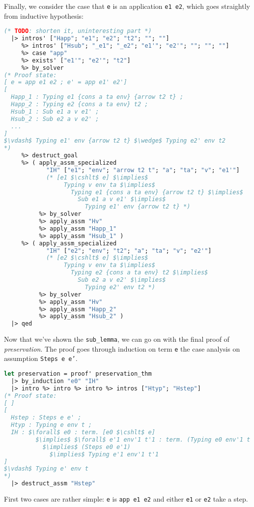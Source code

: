 \documentclass[english, mgr]{iithesis}
\renewcommand{\tt}[1]{\texttt{\small{#1}}}
\renewcommand{\it}[1]{\textit{#1}}
\begin{document}
Finally, we consider the case that \tt{e} is an application \tt{e1 e2},
which goes straightly from inductive hypothesis:
\begin{lstlisting}[mathescape, language=OCaml]
  (* TODO: shorten it, uninteresting part *)
  |> intros' ["Happ"; "e1"; "e2"; "t2"; ""; ""]
     %> intros' ["Hsub"; "_e1"; "_e2"; "e1'"; "e2'"; ""; ""; ""]
     %> case "app"
     %> exists' ["e1'"; "e2'"; "t2"]
     %> by_solver
(* Proof state:
[ e = app e1 e2 ; e' = app e1' e2']
[
  Happ_1 : Typing e1 {cons a ta env} {arrow t2 t} ;
  Happ_2 : Typing e2 {cons a ta env} t2 ;
  Hsub_1 : Sub e1 a v e1' ;
  Hsub_2 : Sub e2 a v e2' ;
  ...
]
$\vdash$ Typing e1' env {arrow t2 t} $\wedge$ Typing e2' env t2
*)
     %> destruct_goal
     %> ( apply_assm_specialized
            "IH" ["e1"; "env"; "arrow t2 t"; "a"; "ta"; "v"; "e1'"]
            (* [e1 $\cshlt$ e] $\implies$
                 Typing v env ta $\implies$
                   Typing e1 {cons a ta env} {arrow t2 t} $\implies$
                     Sub e1 a v e1' $\implies$
                       Typing e1' env {arrow t2 t} *)
          %> by_solver
          %> apply_assm "Hv"
          %> apply_assm "Happ_1"
          %> apply_assm "Hsub_1" )
     %> ( apply_assm_specialized
            "IH" ["e2"; "env"; "t2"; "a"; "ta"; "v"; "e2'"]
            (* [e2 $\cshlt$ e] $\implies$
                 Typing v env ta $\implies$
                   Typing e2 {cons a ta env} t2 $\implies$
                     Sub e2 a v e2' $\implies$
                       Typing e2' env t2 *)
          %> by_solver
          %> apply_assm "Hv"
          %> apply_assm "Happ_2"
          %> apply_assm "Hsub_2" )
  |> qed
\end{lstlisting}
Now that we've shown the \tt{sub\_lemma}, we can go on with the final proof
of \it{preservation}.
The proof goes through induction on term \tt{e} the case analysis on assumption \tt{Steps e e'}.
\begin{lstlisting}[mathescape, language=OCaml]
let preservation = proof' preservation_thm
  |> by_induction "e0" "IH"
  |> intro %> intro %> intro %> intros ["Htyp"; "Hstep"]
(* Proof state:
[ ]
[
  Hstep : Steps e e' ;
  Htyp : Typing e env t ;
  IH : $\forall$ e0 : term. [e0 $\cshlt$ e]
         $\implies$ $\forall$ e'1 env'1 t'1 : term. (Typing e0 env'1 t'1)
           $\implies$ (Steps e0 e'1)
             $\implies$ Typing e'1 env'1 t'1
]
$\vdash$ Typing e' env t
*)
  |> destruct_assm "Hstep"
\end{lstlisting}
First two cases are rather simple: \tt{e} is \tt{app e1 e2} and either \tt{e1} or \tt{e2} take a step.
\end{document}
